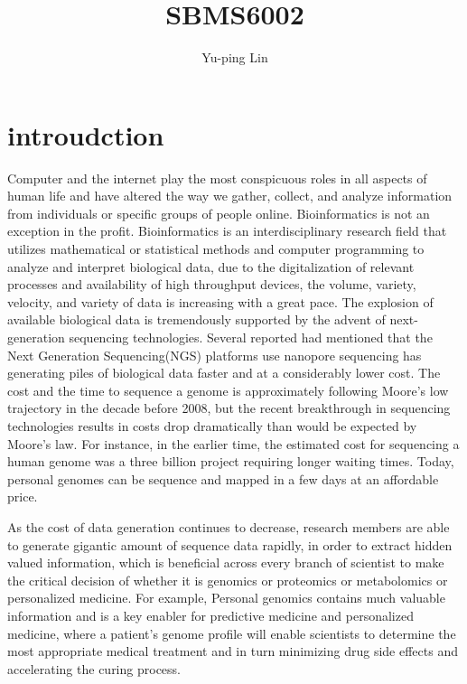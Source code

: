 \documentclass{article}
\begin{document}
\title{SBMS6002}
\author{Yu-ping Lin}
\maketitle

\section{introudction}
Computer and the internet play the most conspicuous roles in all aspects of human life and have altered the way we gather, collect, and analyze information from individuals or specific groups of people online. Bioinformatics is not an exception in the profit. Bioinformatics is an interdisciplinary research field that utilizes mathematical or statistical methods and computer programming to analyze and interpret biological data, due to the digitalization of relevant processes and availability of high throughput devices, the volume, variety, velocity, and variety of data is increasing with a great pace. The explosion of available biological data is tremendously supported by the advent of next-generation sequencing technologies. Several reported had mentioned that the Next Generation Sequencing(NGS) platforms use nanopore sequencing has generating piles of biological data faster and at a considerably lower cost. The cost and the time to sequence a genome is approximately following Moore's low trajectory in the decade before 2008, but the recent breakthrough in sequencing technologies results in costs drop dramatically than would be expected by Moore’s law. For instance, in the earlier time, the estimated cost for sequencing a human genome was a three billion project requiring longer waiting times. Today, personal genomes can be  sequence and mapped in a few days at an affordable price. 



As the cost of data generation continues to decrease, 
research members are able to generate gigantic amount of sequence data rapidly, in order to extract hidden valued information, which is beneficial across every branch of scientist to make the critical decision of whether it is genomics or proteomics or metabolomics or personalized medicine. For example, Personal genomics contains much valuable information and is a  key enabler for predictive medicine and personalized medicine, where a patient's genome profile will enable scientists to determine the most appropriate medical treatment and in turn minimizing drug side effects and accelerating the curing process. 
\end{document}
